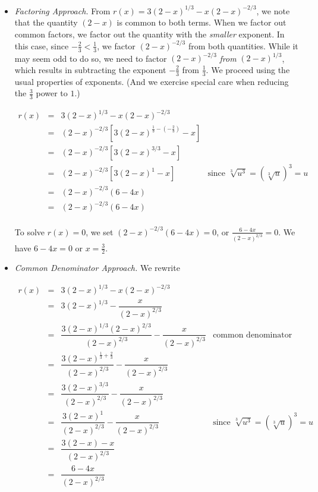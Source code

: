 {\begin{enumerate}
\drawexampleline

\begin{itemize}

\item  \textit{Factoring Approach.}  From $r(x) = 3 (2-x)^{1/3} - x (2-x)^{-2/3}$, we note that the quantity $(2-x)$ is common to both terms.  When we factor out common factors, we factor out the quantity with the \textit{smaller} exponent.  In this case, since $-\frac{2}{3} < \frac{1}{3}$, we factor $(2-x)^{-2/3}$ from both quantities.  While it may seem odd to do so, we need to factor $(2-x)^{-2/3}$ \textit{from} $(2-x)^{1/3}$, which results in subtracting the exponent $-\frac{2}{3}$ from $\frac{1}{3}$.  We proceed using the usual properties of exponents. (And we exercise special care when reducing the $\frac{3}{3}$ power to $1$.)

\[ \begin{array}{rclr}

r(x)  & = & 3 (2-x)^{1/3} - x (2-x)^{-2/3} & \\ [3pt]
      & = & (2-x)^{-2/3} \left[ 3 (2-x)^{\frac{1}{3} - \left(-\frac{2}{3}\right)} - x\right] & \\ [6pt]
      & = & (2-x)^{-2/3}\left[3(2-x)^{3/3} - x\right] & \\ [3pt]
      & = & (2-x)^{-2/3}\left[3(2-x)^{1} - x\right] & \mbox{since $\sqrt[3]{u^3} = \left(\sqrt[3]{u}\right)^{3} = u$} \\ [3pt]
      & = & (2-x)^{-2/3}\left(6-4x\right) & \\ [3pt]
      & = & (2-x)^{-2/3}\left(6-4x\right) & \\
      
\end{array}\]

To solve $r(x) = 0$, we set $(2-x)^{-2/3}\left(6-4x\right) = 0$, or $\frac{6-4x}{(2-x)^{2/3}} = 0$.  We have $6-4x = 0$ or $x = \frac{3}{2}$.



\item \textit{Common Denominator Approach.}  We rewrite 

\[ \begin{array}{rclr}

r(x)  & = & 3 (2-x)^{1/3} - x (2-x)^{-2/3} & \\ [3pt]
      & = & 3 (2-x)^{1/3} - \dfrac{x}{(2-x)^{2/3}} & \\ [10pt]
      & = & \dfrac{3 (2-x)^{1/3}(2-x)^{2/3}}{(2-x)^{2/3}} - \dfrac{x}{(2-x)^{2/3}} & \mbox{common denominator} \\ [10pt]
      & = & \dfrac{3 (2-x)^{\frac{1}{3} + \frac{2}{3}}}{(2-x)^{2/3}} - \dfrac{x}{(2-x)^{2/3}} &  \\ [10pt]
      & = & \dfrac{3 (2-x)^{3/3}}{(2-x)^{2/3}} - \dfrac{x}{(2-x)^{2/3}} & \\ [10pt]
      & = & \dfrac{3 (2-x)^1}{(2-x)^{2/3}} - \dfrac{x}{(2-x)^{2/3}} & \mbox{since $\sqrt[3]{u^3} = \left(\sqrt[3]{u}\right)^{3} = u$} \\ [10pt]
      & = & \dfrac{3 (2-x) - x}{(2-x)^{2/3}} & \\ [10pt]
      & = & \dfrac{6-4x}{(2-x)^{2/3}} & \\


\end{array}\]
\end{itemize}
\end{enumerate}}
